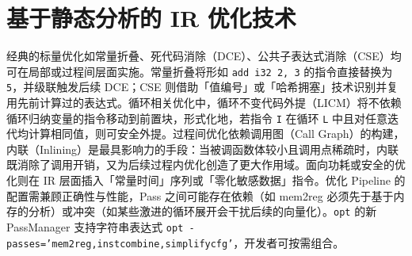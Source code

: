 \chapter{基于静态分析的 IR 优化技术}
经典的标量优化如常量折叠、死代码消除（DCE）、公共子表达式消除（CSE）均可在局部或过程间层面实施。常量折叠将形如 \texttt{add i32 2, 3} 的指令直接替换为 \texttt{5}，并级联触发后续 DCE；CSE 则借助「值编号」或「哈希拥塞」技术识别并复用先前计算过的表达式。循环相关优化中，循环不变代码外提（LICM）将不依赖循环归纳变量的指令移动到前置块，形式化地，若指令 \texttt{I} 在循环 \texttt{L} 中且对任意迭代均计算相同值，则可安全外提。过程间优化依赖调用图（Call Graph）的构建，内联（Inlining）是最具影响力的手段：当被调函数体较小且调用点稀疏时，内联既消除了调用开销，又为后续过程内优化创造了更大作用域。面向功耗或安全的优化则在 IR 层面插入「常量时间」序列或「零化敏感数据」指令。优化 Pipeline 的配置需兼顾正确性与性能，Pass 之间可能存在依赖（如 mem2reg 必须先于基于内存的分析）或冲突（如某些激进的循环展开会干扰后续的向量化）。\texttt{opt} 的新 PassManager 支持字符串表达式 \texttt{opt -passes='mem2reg,instcombine,simplifycfg'}，开发者可按需组合。\par
